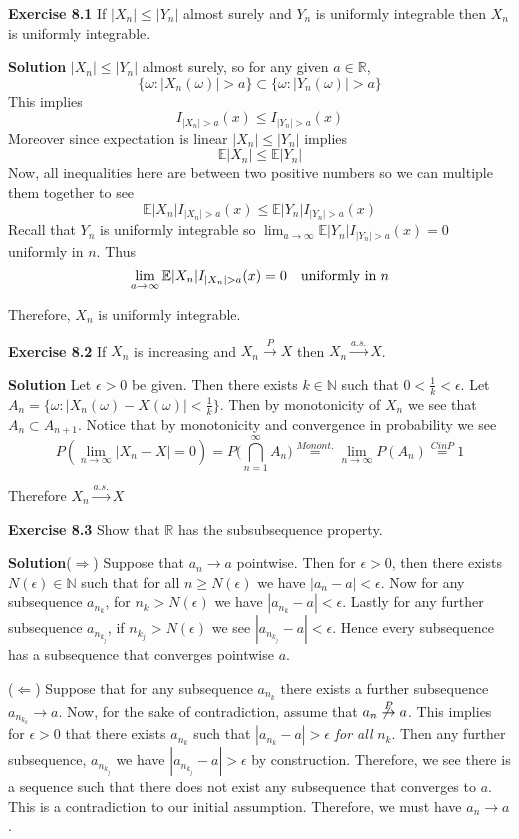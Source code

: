 \documentclass[12pt]{article}  %
\newcommand{\N}{{\mathbb{N}}}
\newcommand{\R}{{\mathbb{R}}}
\newcommand{\e}{{\epsilon}}
\newcommand{\E}{{\mathbb{E}}}
\begin{document}
\textbf{Exercise 8.1} If $|X_n|\leq |Y_n|$ almost surely and $Y_n$ is uniformly integrable then $X_n$ is uniformly integrable.

\textbf{Solution} $|X_n|\leq |Y_n|$ almost surely, so for any given $a\in\R$,  $$\{\omega: |X_n(\omega)|>a\}\subset \{\omega: |Y_n(\omega)|>a\}$$ This implies $$I_{|X_n|>a}(x)\leq I_{|Y_n|>a}(x)$$ Moreover since expectation is linear $|X_n|\leq |Y_n|$ implies $$\E|X_n|\leq \E|Y_n|$$ Now, all inequalities here are between two positive numbers so we can multiple them together to see $$\E|X_n|I_{|X_n|>a}(x)\leq \E|Y_n |I_{|Y_n|>a}(x)$$
Recall that $Y_n$ is uniformly integrable so $\lim_{a\to\infty}\E|Y_n |I_{|Y_n|>a}(x) = 0$ uniformly in $n$. Thus $$\lim_{a\to\infty}\E|X_n |I_{|X_n|>a}(x) = 0 \hspace{1em} \text{uniformly in}\hspace{.3em}n$$

Therefore, $X_n$ is uniformly integrable. 

\newpage

\textbf{Exercise 8.2} If $X_n$ is increasing and $X_n\overset{P}{\to}X$ then $X_n\overset{a.s.}{\to}X$. 

\textbf{Solution} Let $\e>0$ be given. Then there exists $k\in\N$ such that $0<\frac{1}{k}<\e$. Let $A_n = \big\{\omega:|X_n(\omega)-X(\omega)|<\frac{1}{k}\big\}$. Then by monotonicity of $X_n$ we see that $A_n\subset A_{n+1}$. Notice that by monotonicity and convergence in probability we see 
$$P(\lim_{n\to\infty}|X_{n} - X| = 0) = P\Big(\bigcap_{n=1}^{\infty}A_n\Big) \overset{Monont.}{=} \lim_{n\to\infty}P(A_n) \overset{C in P}{=} 1$$

Therefore $X_n\overset{a.s.}{\to}X$

\newpage

\textbf{Exercise 8.3} Show that $\R$ has the subsubsequence property. 

\textbf{Solution}($\Longrightarrow$) Suppose that $a_n \to a$ pointwise. Then for $\e>0$, then there exists $N(\e)\in\N$ such that for all $n\geq N(\e)$ we have $|a_n - a|<\e$. Now for any subsequence $a_{n_k}$, for $n_k>N(\e)$ we have $|a_{n_k} - a|<\e$. Lastly for any further subsequence $a_{n_{k_j}}$, if $n_{k_{j}}>N(\e)$ we see $|a_{n_{k_j}}-a|<\e$. Hence every subsequence has a subsequence that converges pointwise $a$. 

($\Longleftarrow$) Suppose that for any subsequence $a_{n_k}$ there exists a further subsequence $a_{n_{k_k}}\to a$. Now, for the sake of contradiction, assume that $a_n\not\overset{P}{\to}a$. This implies for $\e>0$ that there exists $a_{n_k}$ such that $|a_{n_k}-a|>\e$ \textit{for all} $n_k$. Then any further subsequence, $a_{n_{k_j}}$ we have  $|a_{n_{k_j}}-a|>\e$ by construction. Therefore, we see there is a sequence such that there does not exist any subsequence that converges to $a$. This is a contradiction to our initial assumption. Therefore, we must have $a_n \to a$. 
\newpage
\end{document}
